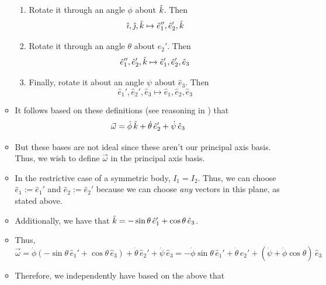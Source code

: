 \documentclass[../notes.tex]{subfiles}
\begin{document}
\begin{itemize}
\begin{itemize}
        \begin{enumerate}
            \item Rotate it through an angle $\phi$ about $\hat{k}$. Then
            \begin{equation*}
                \hat{\imath},\hat{\jmath},\hat{k} \mapsto \hat{e}_1'',\hat{e}_2',\hat{k}
            \end{equation*}
            \item Rotate it through an angle $\theta$ about $\hat{e}_2'$. Then
            \begin{equation*}
                \hat{e}_1'',\hat{e}_2',\hat{k} \mapsto \hat{e}_1',\hat{e}_2',\hat{e}_3
            \end{equation*}
            \item Finally, rotate it about an angle $\psi$ about $\hat{e}_3$. Then
            \begin{equation*}
                \hat{e}_1',\hat{e}_2',\hat{e}_3 \mapsto \hat{e}_1,\hat{e}_2,\hat{e}_3
            \end{equation*}
        \end{enumerate}
        \item It follows based on these definitions (see reasoning in \textcite{bib:KibbleBerkshire}) that
        \begin{equation*}
            \vec{\omega} = \dot{\phi}\,\hat{k}+\dot{\theta}\,\hat{e}_2'+\dot{\psi}\,\hat{e}_3
        \end{equation*}
        \item But these bases are not ideal since these aren't our principal axis basis. Thus, we wish to define $\vec{\omega}$ in the principal axis basis.
        \item In the restrictive case of a symmetric body, $I_1=I_2$. Thus, we can choose $\hat{e}_1:=\hat{e}_1'$ and $\hat{e}_2:=\hat{e}_2'$ because we can choose \emph{any} vectors in this plane, as stated above.
        \item Additionally, we have that $\hat{k}=-\sin\theta\,\hat{e}_1'+\cos\theta\,\hat{e}_3$.
        \item Thus,
        \begin{equation*}
            \vec{\omega} = \dot{\phi}(-\sin\theta\,\hat{e}_1'+\cos\theta\,\hat{e}_3)+\dot{\theta}\,\hat{e}_2'+\dot{\psi}\,\hat{e}_3
            = -\dot{\phi}\sin\theta\,\hat{e}_1'+\dot{\theta}\,\hat{e}_2'+(\dot{\psi}+\dot{\phi}\cos\theta)\,\hat{e}_3
        \end{equation*}
        \item Therefore, we independently have based on the above that

\end{itemize}
\end{itemize}
\end{document}
